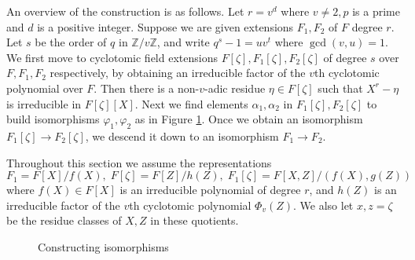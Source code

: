 \documentclass[12pt]{article}
\theoremstyle{plain}
\theoremstyle{definition}
\begin{document}
An overview of the construction is as follows. Let $r = v^d$ where $v \ne 2, p$ is a prime and $d$ 
is a positive integer. Suppose we are given extensions $F_1, F_2$ of $F$ degree $r$. Let $s$ be 
the order of $q$ in $\mathbb{Z} / v\mathbb{Z}$, and write $q^s - 1 = uv^t$ where $\gcd(v, u) = 1$. 
We first move to cyclotomic field extensions $F[\zeta], F_1[\zeta], F_2[\zeta]$ of degree $s$ over 
$F, F_1, F_2$ respectively, by obtaining an irreducible factor of the $v$th cyclotomic polynomial 
over $F$. 
Then there is a non-$v$-adic residue $\eta \in F[\zeta]$ such that $X^r - \eta$ is irreducible in 
$F[\zeta][X]$. Next we find elements $\alpha_1,	 \alpha_2$ in $F_1[\zeta], F_2[\zeta]$ to build 
isomorphisms $\varphi_1, \varphi_2$ as in Figure \ref{figure:isom1}. Once we obtain an isomorphism 
$F_1[\zeta] \rightarrow F_2[\zeta]$, we descend it down to an isomorphism $F_1 \rightarrow F_2$. 

Throughout this section we assume the representations
\begin{equation}
\label{equation:rep}
F_1 = F[X] / f(X), \; F[\zeta] = F[Z] / h(Z), \;
F_1[\zeta] = F[X, Z] / (f(X), g(Z))
\end{equation}
where $f(X) \in F[X]$ is an irreducible polynomial of degree $r$, and $h(Z)$ is an irreducible 
factor of the $v$th cyclotomic polynomial $\Phi_v(Z)$. We also let $x, z = \zeta$ be the residue 
classes of $X, Z$ in these quotients.
\begin{figure}
	\begin{center}
		\caption{Constructing isomorphisms}
		\label{figure:isom1}
	\end{center}
\end{figure}
\end{document}
